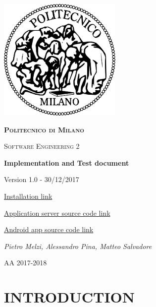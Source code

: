 \documentclass[11pt]{report}
\begin{document}
	\begin{titlepage}
		\centering
		\includegraphics{logo.png}\par\vspace{1cm}
		{\scshape\LARGE\bfseries Politecnico di Milano \par}
		\vspace{1cm}
		{\scshape\Large Software Engineering 2\par}
		\vspace{1.5cm}
		{\Huge\bfseries Implementation and Test document\par}
		\vspace{1cm}
		{\small Version 1.0 - 30/12/2017\par}
		\vspace{1cm}
		{\normalsize\href{https://github.com/JustSalva/MelziPinaSalvadore/tree/master/DeliveryFolder/InstallationFolder}{\color{blue}Installation link}\par} 
		\vspace{0.5cm}
		{\href{https://github.com/JustSalva/MelziPinaSalvadore/tree/master/Implementation/ApplicationServer}{\color{blue}Application server source code link}\par} 
		\vspace{0.5cm}
		{\href{https://github.com/JustSalva/MelziPinaSalvadore/tree/master/Implementation/AndroidApp/Travlendar}{\color{blue}Android app source code link}\par} 
		\vspace{4cm}
		{\Large\itshape Pietro Melzi, Alessandro Pina, Matteo Salvadore\par}

		\vfill

		{\large AA 2017-2018\par}
	\end{titlepage}

	\tableofcontents{}

	\chapter{INTRODUCTION}
	\label{ch:INTRODUCTION}
	
\end{document}
